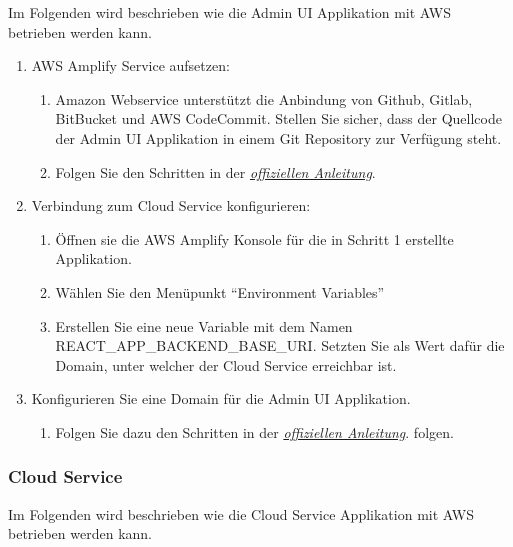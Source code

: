 Im Folgenden wird beschrieben wie die Admin UI Applikation mit AWS betrieben werden kann.

\begin{enumerate}
    \item AWS Amplify Service aufsetzen:
    \begin{enumerate}
        \item Amazon Webservice unterstützt die Anbindung von Github, Gitlab, BitBucket und AWS CodeCommit. Stellen Sie sicher, dass der Quellcode der Admin UI Applikation in einem Git Repository zur Verfügung steht.
        \item Folgen Sie den Schritten in der \href{https://docs.aws.amazon.com/amplify/latest/userguide/getting-started.html}{\textit{offiziellen Anleitung}}.\cite{aws-amplify}
    \end{enumerate}
    \item Verbindung zum Cloud Service konfigurieren:
    \begin{enumerate}
        \item Öffnen sie die AWS Amplify Konsole für die in Schritt 1 erstellte Applikation.
        \item Wählen Sie den Menüpunkt ``Environment Variables''
        \item Erstellen Sie eine neue Variable mit dem Namen REACT\_APP\_BACKEND\_BASE\_URI. Setzten Sie als Wert dafür die Domain, unter welcher der Cloud Service erreichbar ist.
    \end{enumerate}
    \item Konfigurieren Sie eine Domain für die Admin UI Applikation.
    \begin{enumerate}
        \item Folgen Sie dazu den Schritten in der \href{https://docs.aws.amazon.com/amplify/latest/userguide/custom-domains.html}{\textit{offiziellen Anleitung}}.\cite{aws-amplify-domain} folgen.
    \end{enumerate}
\end{enumerate}

\subsubsection*{Cloud Service}

Im Folgenden wird beschrieben wie die Cloud Service Applikation mit AWS betrieben werden kann.

